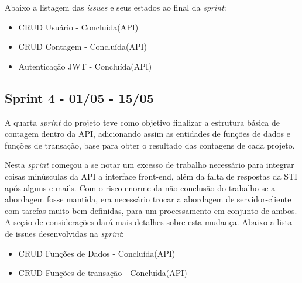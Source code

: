 Abaixo a listagem das \textit{issues} e seus estados ao final da \textit{sprint}:

\begin{itemize}
  \item CRUD Usuário - Concluída(API)
  \item CRUD Contagem - Concluída(API)
  \item Autenticação JWT - Concluída(API)
\end{itemize}

\subsection{Sprint 4 - 01/05 - 15/05}

A quarta \textit{sprint} do projeto teve como objetivo finalizar a estrutura básica de contagem dentro da API, adicionando assim as entidades de funções de dados e funções de transação, base para obter o resultado das contagens de cada projeto.

Nesta \textit{sprint} começou a se notar um excesso de trabalho necessário para integrar coisas minúsculas da API a interface front-end, além da falta de respostas da STI após alguns e-mails. Com o risco enorme da não conclusão do trabalho se a abordagem fosse mantida, era necessário trocar a abordagem de servidor-cliente com tarefas muito bem definidas, para um processamento em conjunto de ambos. A seção de considerações dará mais detalhes sobre esta mudança. Abaixo a lista de issues desenvolvidas na \textit{sprint}:

\begin{itemize}
  \item CRUD Funções de Dados - Concluída(API)
  \item CRUD Funções de transação - Concluída(API)
\end{itemize}
